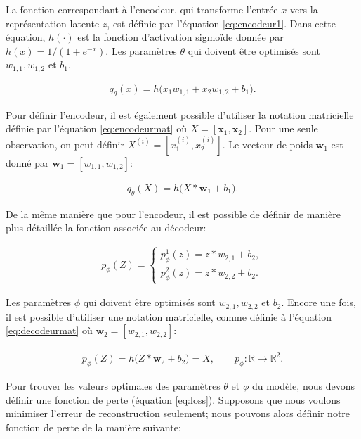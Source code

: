 La fonction correspondant à l'encodeur, qui transforme l'entrée $x$ vers la représentation latente $z$, est définie par l'équation \ref{eq:encodeur1}. Dans cette équation, $h(\cdot)$ est la fonction d'activation sigmoïde donnée par  $h(x)=1/(1+e^{-x})$. Les paramètres $\theta$ qui doivent être optimisés sont $w_{1,1}, w_{1,2}$ et $b_1$. 

\begin{gather}  \label{eq:encodeur1}
q_{\theta}(x)=h\big(x_1w_{1,1} + x_2 w_{1,2} + b_1\big).
\end{gather}

Pour définir l'encodeur, il est également possible d'utiliser la notation matricielle définie par l'équation \ref{eq:encodeurmat} où $X = [\boldsymbol x_1, \boldsymbol x_2]$. Pour une seule observation, on peut définir $X^{(i)} = [x_{1}^{(i)}, x_{2}^{(i)}]$. Le vecteur de poids $\boldsymbol w_1$ est donné par $\boldsymbol w_1 = [w_{1,1}, w_{1,2}]$:

\begin{gather}  \label{eq:encodeurmat}
q_{\theta}(X)=h\big(X*\boldsymbol w_1 + b_1\big).
\end{gather}

De la même manière que pour l'encodeur, il est possible de définir de manière plus détaillée la fonction associée au décodeur:

\begin{gather*}  \label{eq:decodeur}
p_{\phi}(Z)=
\begin{cases}
p_{\phi}^1(z) = z*w_{2,1}+b_2, \\
p_{\phi}^2(z) = z*w_{2,2}+b_2.
\end{cases}
\end{gather*}

Les paramètres $\phi$ qui doivent être optimisés sont $w_{2,1}, w_{2,2}$ et $b_2$. Encore une fois, il est possible d'utiliser une notation matricielle, comme définie à l'équation \ref{eq:decodeurmat} où $\boldsymbol w_2 = [w_{2,1}, w_{2,2}]$:

\begin{gather} \label{eq:decodeurmat}
p_{\phi}(Z)=h\big(Z*\boldsymbol w_2 + b_2\big)=\hat{X}, \qquad
p_{\phi}: \mathbb{R}\rightarrow \mathbb{R}^2.
\end{gather}

Pour trouver les valeurs optimales des paramètres $\theta$ et $\phi$ du modèle, nous devons définir une fonction de perte (équation \ref{eq:loss}). Supposons que nous voulons minimiser l'erreur de reconstruction seulement; nous pouvons alors définir notre fonction de perte de la manière suivante:

